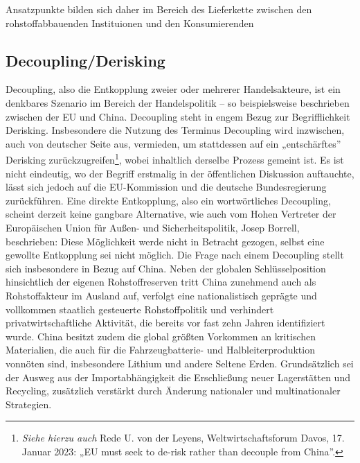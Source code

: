\documentclass[12pt,a4paper,oneside]{book} %
\begin{document}
	Ansatzpunkte bilden sich daher im Bereich des Lieferkette zwischen den rohstoffabbauenden Instituionen und den Konsumierenden
	
	
	\subsection{Decoupling/Derisking}
	Decoupling, also die Entkopplung zweier oder mehrerer Handelsakteure, ist ein denkbares Szenario im Bereich der Handelspolitik – so beispielsweise beschrieben zwischen der EU und China.\autocite{fuest_geopolitische_2022} Decoupling steht in engem Bezug zur Begrifflichkeit Derisking. Insbesondere die Nutzung des Terminus Decoupling wird inzwischen, auch von deutscher Seite aus, vermieden, um stattdessen auf ein „entschärftes” Derisking zurückzugreifen\footnote{\textit{Siehe hierzu auch} Rede U. von der Leyens, Weltwirtschaftsforum Davos, 17. Januar 2023: „EU must seek to de-risk rather than decouple from China”.}, wobei inhaltlich derselbe Prozess gemeint ist. Es ist nicht eindeutig, wo der Begriff erstmalig in der öffentlichen Diskussion auftauchte, lässt sich jedoch auf die EU-Kommission und die deutsche Bundesregierung zurückführen.\autocite{kormbaki_wettstreit_2023} Eine direkte Entkopplung, also ein wortwörtliches Decoupling, scheint derzeit keine gangbare Alternative, wie auch vom Hohen Vertreter der Europäischen Union für Außen- und Sicherheitspolitik, Josep Borrell, beschrieben: Diese Möglichkeit werde nicht in Betracht gezogen, selbst eine gewollte Entkopplung sei nicht möglich.\autocite{europaischer_auswartiger_dienst_foreign_2023} Die Frage nach einem Decoupling stellt sich insbesondere in Bezug auf China. Neben der globalen Schlüsselposition hinsichtlich der eigenen Rohstoffreserven tritt China zunehmend auch als Rohstoffakteur im Ausland auf, verfolgt eine nationalistisch geprägte und vollkommen staatlich gesteuerte Rohstoffpolitik und verhindert privatwirtschaftliche Aktivität, die bereits vor fast zehn Jahren identifiziert wurde.\autocite{sausmikat_chinas_2015} China besitzt zudem die global größten Vorkommen an kritischen Materialien, die auch für die Fahrzeugbatterie- und Halbleiterproduktion vonnöten sind, insbesondere Lithium und andere Seltene Erden. Grundsätzlich sei der Ausweg aus der Importabhängigkeit die Erschließung neuer Lagerstätten und Recycling, zusätzlich verstärkt durch Änderung nationaler und multinationaler Strategien.\autocite{wissenschaftliche_dienste_des_deutschen_bundestages_seltene_2022}

	
\end{document}
